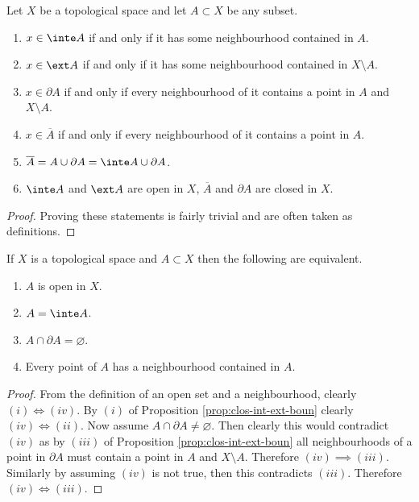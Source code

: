 \begin{proposition}[]
	\label{prop:clos-int-ext-boun}
	Let $X$ be a topological space and let $A \subset X$ be any subset.
	\begin{enumerate}
		\item $x \in \inte A$ if and only if it has some neighbourhood contained 
			in $A$.

		\item $x \in \ext A$ if and only if it has some neighbourhood contained
			in $X \setminus A$.

		\item $x \in \partial A$ if and only if every neighbourhood of it
			contains a point in $A$ and $X \setminus A$.

		\item $x \in \overline A$ if and only if every neighbourhood of it
			contains a point in $A$.

		\item $\overline A = A \cup \partial A = \inte A \cup \partial A$.

		\item $\inte A$ and $\ext A$ are open in $X$,
			$\overline A$ and $\partial A$ are closed in $X$.
	\end{enumerate}
\end{proposition}

\begin{proof}
	Proving these statements is fairly trivial 
	and are often taken as definitions.
\end{proof}

\begin{proposition}[]
	If $X$ is a topological space and $A \subset X$ then the following are
	equivalent.
	\begin{enumerate}
		\item $A$ is open in $X$.
		\item $A = \inte A$.
		\item $A \cap \partial A = \varnothing$.
		\item Every point of $A$ has a neighbourhood contained in $A$.
	\end{enumerate}
\end{proposition}

\begin{proof}
	From the definition of an open set and a neighbourhood, clearly
	$(i) \iff (iv)$.
	By $(i)$ of Proposition \ref{prop:clos-int-ext-boun} clearly 
	$(iv) \iff (ii)$.
	Now assume $A \cap \partial A \neq \varnothing$. 
	Then clearly this would contradict $(iv)$ as by 
	$(iii)$ of Proposition \ref{prop:clos-int-ext-boun} 
	all neighbourhoods of a point in $\partial A$ must contain a point in $A$
	and $X \setminus A$. Therefore $(iv) \implies (iii)$.
	Similarly by assuming $(iv)$ is not true, then this contradicts $(iii)$.
	Therefore $(iv) \iff (iii)$.
\end{proof}

